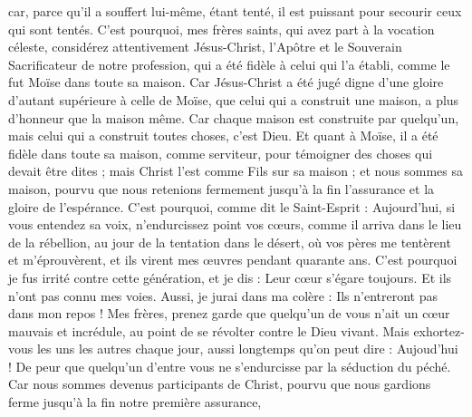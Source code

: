 \begin{multicols}{2}
car, parce qu'il a souffert lui-même, étant tenté, il est puissant pour secourir ceux qui sont tentés.
\VerseOne{}C'est pourquoi, mes frères saints, qui avez part à la vocation céleste, considérez attentivement Jésus-Christ, l'Apôtre et le Souverain Sacrificateur de notre profession,
qui a été fidèle à celui qui l'a établi, comme le fut Moïse dans toute sa maison.
Car Jésus-Christ a été jugé digne d'une gloire d'autant supérieure à celle de Moïse, que celui qui a construit une maison, a plus d'honneur que la maison même.
Car chaque maison est construite par quelqu'un, mais celui qui a construit toutes choses, c'est Dieu.
Et quant à Moïse, il a été fidèle dans toute sa maison, comme serviteur, pour témoigner des choses qui devait être dites ;
mais Christ l'est comme Fils sur sa maison ; et nous sommes sa maison, pourvu que nous retenions fermement jusqu'à la fin l'assurance et la gloire de l'espérance.
C'est pourquoi, comme dit le Saint-Esprit : Aujourd'hui, si vous entendez sa voix,
n'endurcissez point vos cœurs, comme il arriva dans le lieu de la rébellion, au jour de la tentation dans le désert,
où vos pères me tentèrent et m'éprouvèrent, et ils virent mes œuvres pendant quarante ans.
C'est pourquoi je fus irrité contre cette génération, et je dis : Leur cœur s'égare toujours. Et ils n'ont pas connu mes voies.
Aussi, je jurai dans ma colère : Ils n'entreront pas dans mon repos !
Mes frères, prenez garde que quelqu'un de vous n'ait un cœur mauvais et incrédule, au point de se révolter contre le Dieu vivant.
Mais exhortez-vous les uns les autres chaque jour, aussi longtemps qu'on peut dire : Aujoud'hui ! De peur que quelqu'un d'entre vous ne s'endurcisse par la séduction du péché.
Car nous sommes devenus participants de Christ, pourvu que nous gardions ferme jusqu'à la fin notre première assurance,

\end{multicols}
